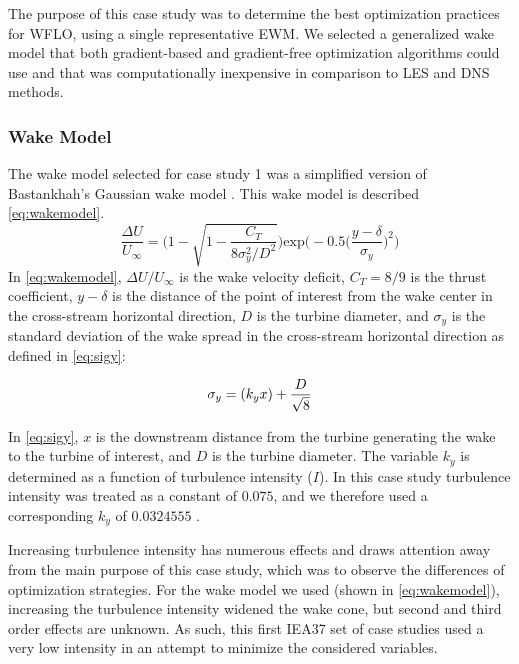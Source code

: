 The purpose of this case study was to determine the best optimization practices for WFLO, using a single representative EWM.
We selected a generalized wake model that both gradient-based and gradient-free optimization algorithms could use and that was computationally inexpensive in comparison to LES and DNS methods.
    
    \subsubsection{Wake Model} \label{sec:wakemodel}
        The wake model selected for case study 1 was a simplified version of Bastankhah's Gaussian wake model \cite{Bastankhah2016,ThomasNing2018}.
        This wake model is described \cref{eq:wakemodel}.
%
        \begin{equation}
            \frac{\Delta U}{U_{\infty}}
            =
            \Bigg(
            1 - \sqrt{
                1 - \frac{C_T}
                {8\sigma_{y}^{2}/D^2}
            }
            \Bigg)
            \text{exp}\bigg(
            -0.5\Big(
                \frac{y-\delta}{\sigma_{y}}
                \Big)^2
            \bigg)
            \label{eq:wakemodel}
        \end{equation}
%
        In \cref{eq:wakemodel}, $\Delta U/U_{\infty}$ is the wake velocity deficit, $C_T = 8/9$ is the thrust coefficient, $y-\delta$ is the distance of the point of interest from the wake center in the cross-stream horizontal direction, $D$ is the turbine diameter, and $\sigma_y$ is the standard deviation of the wake spread in the cross-stream horizontal direction as defined in \cref{eq:sigy}:

        \begin{equation}
            \sigma_y = (k_y x) + \frac{D}{\sqrt{8}} \\
            \label{eq:sigy}
        \end{equation}

        In \cref{eq:sigy}, $x$ is the downstream distance from the turbine generating the wake to the turbine of interest, and $D$ is the turbine diameter. The variable $k_y$ is determined as a function of turbulence intensity ($I$).
        In this case study turbulence intensity was treated as a constant of $0.075$, and we therefore used a corresponding $k_{y}$ of $0.0324555$ \cite{Niayifar2016,ThomasNing2018}.

        Increasing turbulence intensity has numerous effects and draws attention away from the main purpose of this case study, which was to observe the differences of optimization strategies.
        For the wake model we used (shown in \cref{eq:wakemodel}), increasing the turbulence intensity widened the wake cone, but second and third order effects are unknown.
        As such, this first IEA37 set of case studies used a very low intensity in an attempt to minimize the considered variables.

